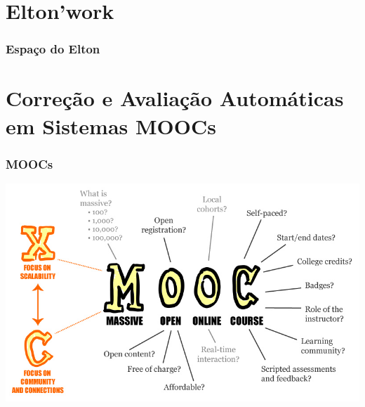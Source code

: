 \documentclass{beamer}
\begin{document}
\section{Elton'work}

\begin{frame}
 \frametitle{Espaço do Elton}
\end{frame}

\section{Correção e Avaliação Automáticas em Sistemas MOOCs}

\begin{frame}
  \frametitle{MOOCs}

  \includegraphics[scale=0.4]{img/moocs.jpg}
\end{frame}
\end{document}
